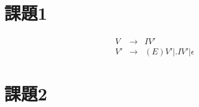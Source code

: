 \documentclass[a4paper,12pt]{jarticle}
\begin{document}
\section*{課題1}
\begin{comment}
左再帰をもつ構文規則、
\begin{displaymath}
V \rightarrow I | V \left( E \right) | V . I
\end{displaymath}
を、変換の過程を詳細に示しながら、右再帰の構文規則に変換せよ。
\end{comment}
\begin{eqnarray*}
V & \rightarrow & I V' \\
V' & \rightarrow & \left( E \right) V' | . I V' | \epsilon
\end{eqnarray*}
\section*{課題2}
\begin{comment}
次の文法、
\begin{enumerate}
\renewcommand{\labelenumi}{(\arabic{enumi})}
\item $ E \rightarrow \left( E \right) $
\item $ | F $
\item $ | C $
\item $ | V $
\item $ V \rightarrow I X $
\item $ X \rightarrow [ E ] $
\item $ | \epsilon $
\item $ F \rightarrow I \left( L \right)$
\item $ L \rightarrow E T $
\item $ | \epsilon $
\item $ T \rightarrow , E T $
\item $ | \epsilon$
\end{enumerate}
についての問に答えよ。ただし、$ I $と$ C $は終端記号であるとする。また、過程の詳細も示せ。
\begin{enumerate}
\renewcommand{\labelenumi}{(\alph{enumi})}
\item 各終端器号のFirst集合とFollow集合を求めよ。
\item 構文解析表を作れ。
\item この文法の問題点を指摘し、どう改めればよいかを述べよ。
\end{enumerate}
\end{comment}
\end{document}

